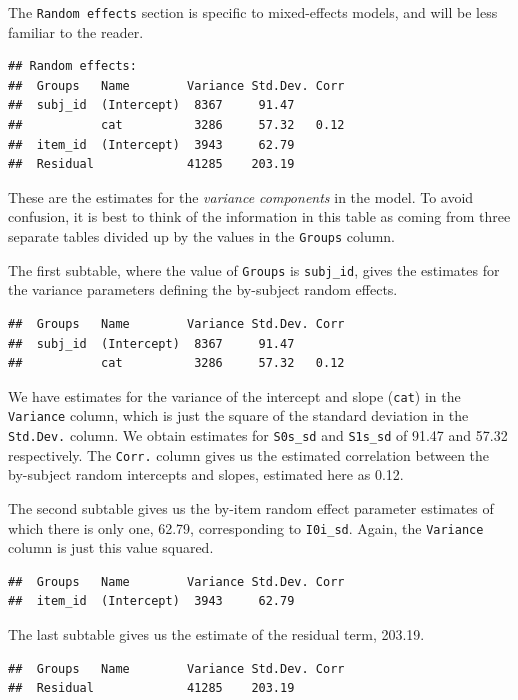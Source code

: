\documentclass[doc,floatsintext]{apa6}
\begin{document}
The \texttt{Random\ effects} section is specific to mixed-effects
models, and will be less familiar to the reader.

\begin{verbatim}
## Random effects:
##  Groups   Name        Variance Std.Dev. Corr
##  subj_id  (Intercept)  8367     91.47       
##           cat          3286     57.32   0.12
##  item_id  (Intercept)  3943     62.79       
##  Residual             41285    203.19
\end{verbatim}

\noindent These are the estimates for the \emph{variance components} in
the model. To avoid confusion, it is best to think of the information in
this table as coming from three separate tables divided up by the values
in the \texttt{Groups} column.

The first subtable, where the value of \texttt{Groups} is
\texttt{subj\_id}, gives the estimates for the variance parameters
defining the by-subject random effects.

\begin{verbatim}
##  Groups   Name        Variance Std.Dev. Corr
##  subj_id  (Intercept)  8367     91.47       
##           cat          3286     57.32   0.12
\end{verbatim}

\noindent We have estimates for the variance of the intercept and slope
(\texttt{cat}) in the \texttt{Variance} column, which is just the square
of the standard deviation in the \texttt{Std.Dev.} column. We obtain
estimates for \texttt{S0s\_sd} and \texttt{S1s\_sd} of 91.47 and 57.32
respectively. The \texttt{Corr.} column gives us the estimated
correlation between the by-subject random intercepts and slopes,
estimated here as 0.12.

The second subtable gives us the by-item random effect parameter
estimates of which there is only one, 62.79, corresponding to
\texttt{I0i\_sd}. Again, the \texttt{Variance} column is just this value
squared.

\begin{verbatim}
##  Groups   Name        Variance Std.Dev. Corr
##  item_id  (Intercept)  3943     62.79
\end{verbatim}

The last subtable gives us the estimate of the residual term, 203.19.

\begin{verbatim}
##  Groups   Name        Variance Std.Dev. Corr
##  Residual             41285    203.19
\end{verbatim}
\end{document}
